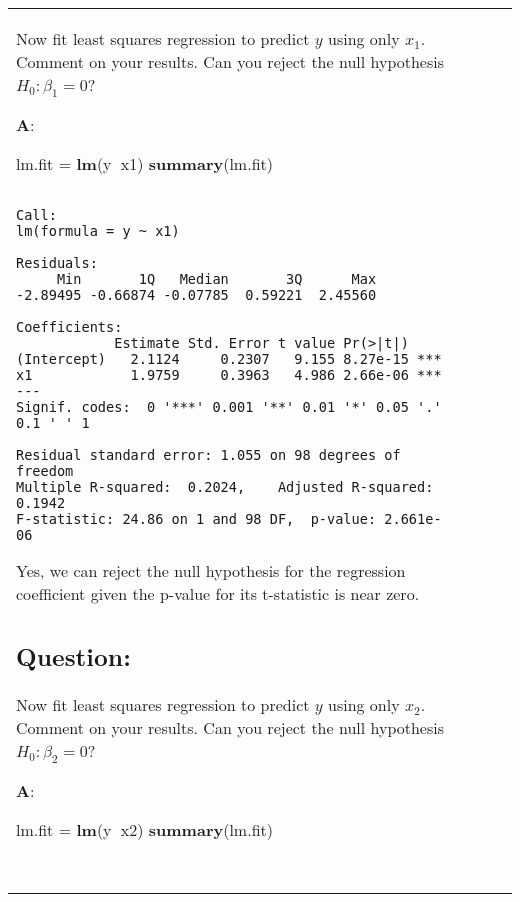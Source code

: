 \documentclass[12pt,]{article}
\newenvironment{Shaded}{\begin{snugshade}}{\end{snugshade}}
\newcommand{\KeywordTok}[1]{\textcolor[rgb]{0.13,0.29,0.53}{\textbf{#1}}}
\newcommand{\NormalTok}[1]{#1}
\newcommand{\OperatorTok}[1]{\textcolor[rgb]{0.81,0.36,0.00}{\textbf{#1}}}
\newcommand{\StringTok}[1]{\textcolor[rgb]{0.31,0.60,0.02}{#1}}
\begin{document}
\begin{tabularx}{0.5\textwidth}{p{} p{} p{} p{}}
Now fit least squares regression to predict \(y\) using only \(x_1\).
Comment on your results. Can you reject the null hypothesis
\(H_0: \beta_1=0\)?

\textbf{A}:

\begin{Shaded}
\begin{Highlighting}[]
\NormalTok{lm.fit =}\StringTok{ }\KeywordTok{lm}\NormalTok{(y}\OperatorTok{~}\NormalTok{x1)}
\KeywordTok{summary}\NormalTok{(lm.fit)}
\end{Highlighting}
\end{Shaded}

\begin{verbatim}

Call:
lm(formula = y ~ x1)

Residuals:
     Min       1Q   Median       3Q      Max 
-2.89495 -0.66874 -0.07785  0.59221  2.45560 

Coefficients:
            Estimate Std. Error t value Pr(>|t|)    
(Intercept)   2.1124     0.2307   9.155 8.27e-15 ***
x1            1.9759     0.3963   4.986 2.66e-06 ***
---
Signif. codes:  0 '***' 0.001 '**' 0.01 '*' 0.05 '.' 0.1 ' ' 1

Residual standard error: 1.055 on 98 degrees of freedom
Multiple R-squared:  0.2024,    Adjusted R-squared:  0.1942 
F-statistic: 24.86 on 1 and 98 DF,  p-value: 2.661e-06
\end{verbatim}

Yes, we can reject the null hypothesis for the regression coefficient
given the p-value for its t-statistic is near zero.

\hypertarget{question-22}{%
\subsection{Question:}\label{question-22}}

Now fit least squares regression to predict \(y\) using only \(x_2\).
Comment on your results. Can you reject the null hypothesis
\(H_0: \beta_2=0\)?

\textbf{A}:

\begin{Shaded}
\begin{Highlighting}[]
\NormalTok{lm.fit =}\StringTok{ }\KeywordTok{lm}\NormalTok{(y}\OperatorTok{~}\NormalTok{x2)}
\KeywordTok{summary}\NormalTok{(lm.fit)}
\end{Highlighting}
\end{Shaded}

\begin{verbatim}


\end{verbatim}
\end{tabularx}
\end{document}
